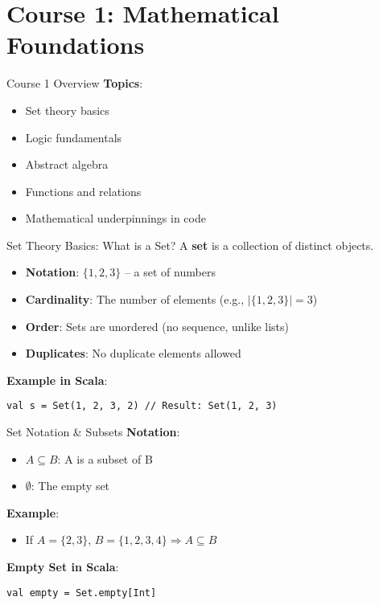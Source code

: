\documentclass{beamer}
\begin{document}
\section{Course 1: Mathematical Foundations}

\begin{frame}{Course 1 Overview}
\textbf{Topics}:
\begin{itemize}
    \item Set theory basics
    \item Logic fundamentals
    \item Abstract algebra
    \item Functions and relations
    \item Mathematical underpinnings in code
\end{itemize}
\end{frame}

\begin{frame}{Set Theory Basics: What is a Set?}
A \textbf{set} is a collection of distinct objects.

\begin{itemize}
    \item \textbf{Notation}: $\{1, 2, 3\}$ – a set of numbers
    \item \textbf{Cardinality}: The number of elements (e.g., $|\{1,2,3\}| = 3$)
    \item \textbf{Order}: Sets are unordered (no sequence, unlike lists)
    \item \textbf{Duplicates}: No duplicate elements allowed
\end{itemize}

\textbf{Example in Scala}:
\begin{lstlisting}
val s = Set(1, 2, 3, 2) // Result: Set(1, 2, 3)
\end{lstlisting}
\end{frame}

\begin{frame}{Set Notation \& Subsets}
\textbf{Notation}:
\begin{itemize}
    \item $A \subseteq B$: A is a subset of B
    \item $\emptyset$: The empty set
\end{itemize}

\textbf{Example}:
\begin{itemize}
    \item If $A = \{2, 3\}$, $B = \{1, 2, 3, 4\} \Rightarrow A \subseteq B$
\end{itemize}

\textbf{Empty Set in Scala}:
\begin{lstlisting}
val empty = Set.empty[Int]
\end{lstlisting}
\end{frame}
\end{document}
